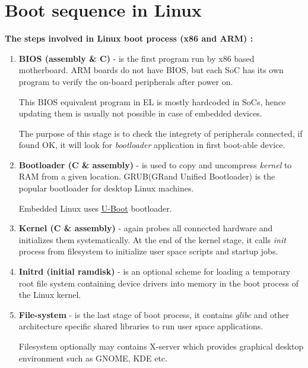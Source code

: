 \documentclass[letterpaper,10pt,english]{sphinxmanual}
\begin{document}
\begin{DUlineblock}{0em}
\item[] 
\end{DUlineblock}


\chapter{Boot sequence in Linux}
\label{embedded-linux:boot-sequence-in-linux}
\textbf{The steps involved in Linux boot process (x86 and ARM) :}
\begin{enumerate}
\item {} 
\textbf{BIOS (assembly \& C)} - is the first program run by x86 based motherboard. ARM boards do
not have BIOS, but each SoC has its own program to verify the on-board peripherals
after power on.

This BIOS equivalent program in EL is mostly hardcoded in SoCs, hence updating them
is usually not possible in case of embedded devices.

The purpose of this stage is to check the integrety of peripherals connected,
if found OK, it will look for \emph{bootloader} application in first boot-able device.

\item {} 
\textbf{Bootloader (C \& assembly)} - is used to copy and uncompress \emph{kernel} to RAM from a given
location. GRUB(GRand Unified Bootloader) is the popular bootloader for desktop
Linux machines.

Embedded Linux uses \href{http://www.denx.de/wiki/U-Boot/}{U-Boot} bootloader.

\item {} 
\textbf{Kernel (C \& assembly)} - again probes all connected hardware and initializes
them systematically. At the end of the kernel stage, it calls \emph{init} process
from filesystem to initialize user space scripts and startup jobs.

\item {} 
\textbf{Initrd (initial ramdisk)} - is an optional scheme for loading a temporary
root file system containing device drivers into memory in the boot process of
the Linux kernel.

\item {} 
\textbf{File-system} - is the last stage of boot process, it contains \emph{glibc} and
other architecture specific shared libraries to run user space applications.

Filesystem optionally may contains X-server which provides graphical desktop
environment such as GNOME, KDE etc.

\end{enumerate}
\end{document}
